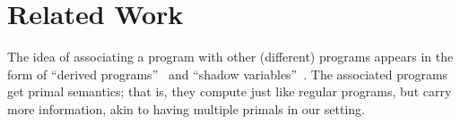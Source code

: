 \documentclass[preprint]{sig-alternate-05-2015}
\begin{document}



\section{Related Work}

The idea of associating a program with other (different) programs
appears in the form of ``derived programs''~\cite{clt92}
and ``shadow variables''~\cite{DBLP:journals/scp/Morgan09}.
The associated programs get primal semantics; that is, they
compute just like regular programs, but carry more information, akin to
having multiple primals in our setting.
\end{document}
